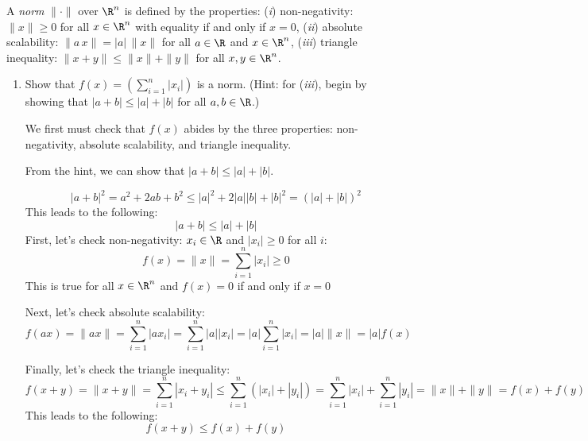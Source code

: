\documentclass{article}
\begin{document}
\begin{aprob}
    A \emph{norm} $\|\cdot\|$ over $\R^n$ is defined by the properties:
    (\textit{i}) non-negativity: $\|x\|\geq 0$ for all $x \in \R^n$ with equality if and only if $x=0$,
    (\textit{ii}) absolute scalability: $\|a \, x\| = |a| \, \|x\|$ for all $a \in \R$ and $x \in \R^n$, 
    (\textit{iii}) triangle inequality: $\|x+y\| \leq \|x\| + \|y\|$ for all $x,y \in \R^n$.
    \begin{enumerate}
      \item {} Show that $f(x) = \left( \sum_{i=1}^n |x_i| \right)$ is a norm. (Hint: for (\textit{iii}), begin by showing that $|a+b|\leq |a| + |b|$ for all $a,b \in \R$.)
      
      We first must check that $f(x)$ abides by the three properties: non-negativity, absolute scalability, and triangle inequality. 
      
      From the hint, we can show that $|a+b|\leq |a| + |b|$.
      
      \begin{equation}
          |a+b|^2 = a^2 + 2ab + b^2 \leq |a|^2 + 2|a||b| + |b|^2 = (|a|+|b|)^2
      \end{equation}
      This leads to the following:
        \begin{equation}
          |a+b|\leq |a| + |b|
      \end{equation}
      First, let's check non-negativity: $x_i \in \R $ and $|x_i| \geq 0 $ for all $i$:
      \begin{equation}
          f(x) = \|x\| = \sum_{i=1}^{n} |x_i| \geq 0
      \end{equation}
      This is true for all $x \in \R^n$ and $f(x) = 0$ if and only if $x = 0$
      
      Next, let's check absolute scalability:
      \begin{equation}
        f(ax) = \|ax\| = \sum_{i=1}^{n} |a x_i| = \sum_{i=1}^{n} |a||x_i| = |a|\sum_{i=1}^{n}|x_i| = |a|\|x\| = |a|f(x)
      \end{equation}
      
      Finally, let's check the triangle inequality:
      \begin{equation}
        f(x + y) = \|x + y\| = \sum_{i=1}^{n} |x_i + y_i| \leq \sum_{i=1}^{n} (|x_i| + |y_i|) = \sum_{i=1}^{n} |x_i| + \sum_{i=1}^{n} |y_i| = \|x\| + \|y\| = f(x) + f(y)
      \end{equation}
      This leads to the following:
      \begin{equation}
        f(x + y) \leq f(x) + f(y)
      \end{equation}
      

\end{enumerate}
\end{aprob}
\end{document}
